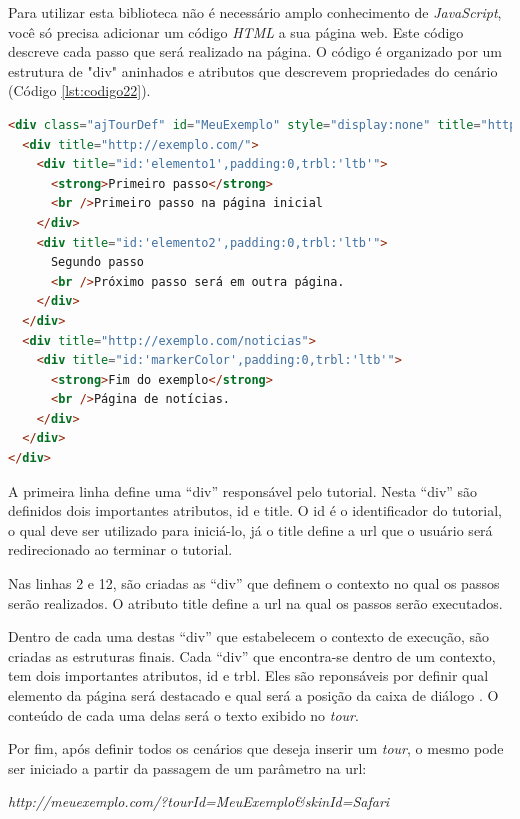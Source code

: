 Para utilizar esta biblioteca não é necessário amplo conhecimento de \textit{JavaScript}, você só precisa adicionar um código \textit{HTML} a sua página web. Este código descreve cada passo que será realizado na página. O código é organizado por um estrutura de "div" aninhados e atributos que descrevem propriedades do cenário (Código \ref{lst:codigo22}).

{\singlespace
\begin{lstlisting}[caption=Estrutura do código \textit{HTML} do \textit{Amberjack},language=HTML,label={lst:codigo23}]
<div class="ajTourDef" id="MeuExemplo" style="display:none" title="http://feedback.exemplo.com/">
  <div title="http://exemplo.com/">
    <div title="id:'elemento1',padding:0,trbl:'ltb'">
      <strong>Primeiro passo</strong>
      <br />Primeiro passo na página inicial
    </div>
    <div title="id:'elemento2',padding:0,trbl:'ltb'">
      Segundo passo
      <br />Próximo passo será em outra página.
    </div>    
  </div>
  <div title="http://exemplo.com/noticias">
    <div title="id:'markerColor',padding:0,trbl:'ltb'">
      <strong>Fim do exemplo</strong>
      <br />Página de notícias.
    </div>
  </div>
</div>
\end{lstlisting}
}

A primeira linha define uma ``div'' responsável pelo tutorial. Nesta ``div'' são definidos dois importantes atributos, id e title. O id é o identificador do tutorial, o qual deve ser utilizado para iniciá-lo, já o title define a url que o usuário será redirecionado ao terminar o tutorial.

Nas linhas 2 e 12, são criadas as ``div'' que definem o contexto no qual os passos serão realizados. O atributo title define a url na qual os passos serão executados.

Dentro de cada uma destas ``div'' que estabelecem o contexto de execução, são criadas as estruturas finais. Cada ``div'' que encontra-se dentro de um contexto, tem dois importantes atributos, id e trbl. Eles são reponsáveis por definir qual elemento da página será destacado e qual será a posição da caixa de diálogo \cite{AJ}. O conteúdo de cada uma delas será o texto exibido no \textit{tour}.

Por fim, após definir todos os cenários que deseja inserir um \textit{tour}, o mesmo pode ser iniciado a partir da passagem de um parâmetro na url:

\begin{center}
\textit{http://meuexemplo.com/?tourId=MeuExemplo\&skinId=Safari}
\end{center}